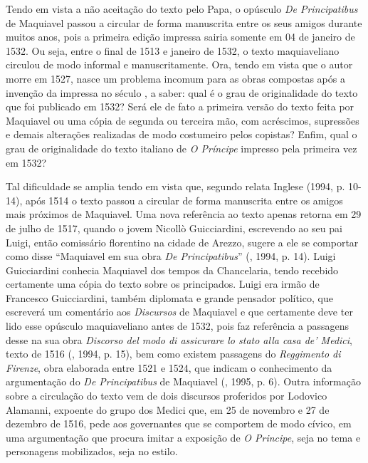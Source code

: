 Tendo em vista a não aceitação do texto pelo Papa, o opúsculo \emph{De
Principatibus} de Maquiavel passou a circular de forma manuscrita entre
os seus amigos durante muitos anos, pois a primeira edição impressa
sairia somente em 04 de janeiro de 1532. Ou seja, entre o final de 1513
e janeiro de 1532, o texto maquiaveliano circulou de modo informal e
manuscritamente. Ora, tendo em vista que o autor morre em 1527, nasce um
problema incomum para as obras compostas após a invenção da impressa no
século , a saber: qual é o grau de originalidade do texto que foi
publicado em 1532? Será ele de fato a primeira versão do texto feita por
Maquiavel ou uma cópia de segunda ou terceira mão, com acréscimos,
supressões e demais alterações realizadas de modo costumeiro pelos
copistas? Enfim, qual o grau de originalidade do texto italiano de
\emph{O Príncipe} impresso pela primeira vez em 1532?

Tal dificuldade se amplia tendo em vista que, segundo relata Inglese
(1994, p. 10- 14), após 1514 o texto passou a circular de forma
manuscrita entre os amigos mais próximos de Maquiavel. Uma nova
referência ao texto apenas retorna em 29 de julho de 1517, quando o
jovem Nicollò Guicciardini, escrevendo ao seu pai Luigi, então
comissário florentino na cidade de Arezzo, sugere a ele se comportar
como disse ``Maquiavel em sua obra \emph{De Principatibus}'' (,
1994, p. 14). Luigi Guicciardini conhecia Maquiavel dos tempos da
Chancelaria, tendo recebido certamente uma cópia do texto sobre os
principados. Luigi era irmão de Francesco Guicciardini, também diplomata
e grande pensador político, que escreverá um comentário aos
\emph{Discursos} de Maquiavel e que certamente deve ter lido esse
opúsculo maquiaveliano antes de 1532, pois faz referência a passagens
desse na sua obra \emph{Discorso del modo di assicurare lo stato alla
casa de' Medici}, texto de 1516 (, 1994, p. 15), bem como existem
passagens do \emph{Reggimento di Firenze}, obra elaborada entre 1521 e
1524, que indicam o conhecimento da argumentação do \emph{De
Principatibus} de Maquiavel (, 1995, p. 6). Outra informação
sobre a circulação do texto vem de dois discursos proferidos por
Lodovico Alamanni, expoente do grupo dos Medici que, em 25 de novembro e
27 de dezembro de 1516, pede aos governantes que se comportem de modo
cívico, em uma argumentação que procura imitar a exposição de \emph{O
Principe}, seja no tema e personagens mobilizados, seja no estilo.

